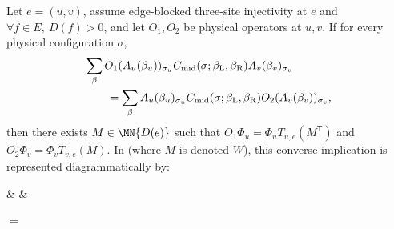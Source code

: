 \begin{lemma}%
    \label{thm:peps_physical_to_virtual_insertion}
    \leanok
    Let $e=(u,v)$, assume edge-blocked three-site injectivity at $e$ and
    $\forall f\in E,\ D(f)>0$, and let $O_1,O_2$ be physical operators at $u,v$.
    If for every physical configuration $\sigma$,
    \begin{align}
         & \sum_{\beta}
        O_1(A_u(\beta_u))_{\sigma_u}
        C_{\mathrm{mid}}(\sigma;\beta_{\mathrm{L}},\beta_{\mathrm{R}})
        A_v(\beta_v)_{\sigma_v}
        \notag          \\
         & \qquad =
        \sum_{\beta}
        A_u(\beta_u)_{\sigma_u}
        C_{\mathrm{mid}}(\sigma;\beta_{\mathrm{L}},\beta_{\mathrm{R}})
        O_2(A_v(\beta_v))_{\sigma_v},
        \label{eq:peps_equal_neighboring_physical_actions}
    \end{align}
    then there exists $M\in\MN{D(e)}$ such that
    $O_1\Phi_u=\Phi_uT_{u,e}(M^{\mathsf T})$ and $O_2\Phi_v=\Phi_vT_{v,e}(M)$.
    In \cite[Section~3]{Molnar2018NormalPEPS} (where $M$ is denoted $W$), this
    converse implication is represented diagrammatically by:
    \begin{center}
        \tenkzkernel
        \begin{tenkz}[rows={ket}, cols=3, physical=up, boundary=periodic]
             &  & 
        \end{tenkz}
        $ = $
        \begin{tenkz}[rows={ket}, cols=3, physical=up, boundary=periodic]

\end{tenkz}
\end{center}
\end{lemma}
